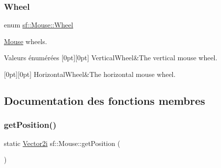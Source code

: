 \subsubsection{\texorpdfstring{Wheel}{Wheel}}
{\footnotesize\ttfamily enum \hyperlink{classsf_1_1Mouse_a60dd479a43f26f200e7957aa11803ff4}{sf\+::\+Mouse\+::\+Wheel}}



\hyperlink{classsf_1_1Mouse}{Mouse} wheels. 

\begin{DoxyEnumFields}{Valeurs énumérées}
[0pt][0pt]{}\mbox{\label{classsf_1_1Mouse_a60dd479a43f26f200e7957aa11803ff4abd571de908d2b2c4b9f165f29c678496}} 
Vertical\+Wheel&The vertical mouse wheel. \\
\hline

[0pt][0pt]{}\mbox{\label{classsf_1_1Mouse_a60dd479a43f26f200e7957aa11803ff4a785768d5e33c77de9fdcfdd02219f4e2}} 
Horizontal\+Wheel&The horizontal mouse wheel. \\
\hline

\end{DoxyEnumFields}


\subsection{Documentation des fonctions membres}
\mbox{\label{classsf_1_1Mouse_ac368680f797b7f6e4f50b5b7928c1387}} 
\subsubsection{\texorpdfstring{get\+Position()}{getPosition()}\hspace{0.1cm}{\footnotesize\ttfamily [1/2]}}
{\footnotesize\ttfamily static \hyperlink{classsf_1_1Vector2}{Vector2i} sf\+::\+Mouse\+::get\+Position (\begin{DoxyParamCaption}{ }\end{DoxyParamCaption})\hspace{0.3cm}{\ttfamily [static]}}



